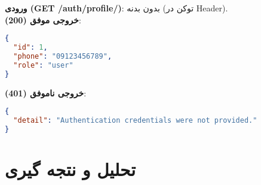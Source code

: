 \documentclass{report}
\begin{document}
\textbf{ورودی (GET /auth/profile/)}: بدون بدنه (توکن در Header). \\

\textbf{خروجی موفق (200)}:
\begin{lstlisting}[language=json]
{
  "id": 1,
  "phone": "09123456789",
  "role": "user"
}
\end{lstlisting}

\textbf{خروجی ناموفق (401)}:
\begin{lstlisting}[language=json]
{
  "detail": "Authentication credentials were not provided."
}
\end{lstlisting}







\chapter{ }

\section{ }

\section{ }

\chapter{تحلیل و نتجه گیری}
 
\end{document}
